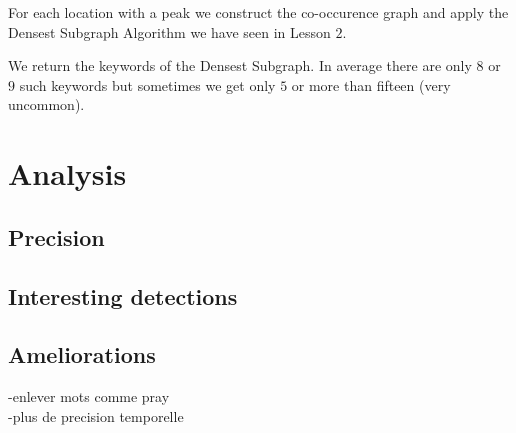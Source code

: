 \documentclass[a4paper]{article}
\begin{document}
For each location with a peak we construct the co-occurence graph and apply the Densest Subgraph Algorithm we have seen in Lesson $2$.

We return the keywords of the Densest Subgraph. In average there are only $8$ or $9$ such keywords but sometimes we get only $5$ or more than fifteen (very uncommon).

\section{Analysis}
\subsection{Precision}
\subsection{Interesting detections}
\subsection{Ameliorations}
-enlever mots comme pray
\\-plus de precision temporelle
\end{document}
